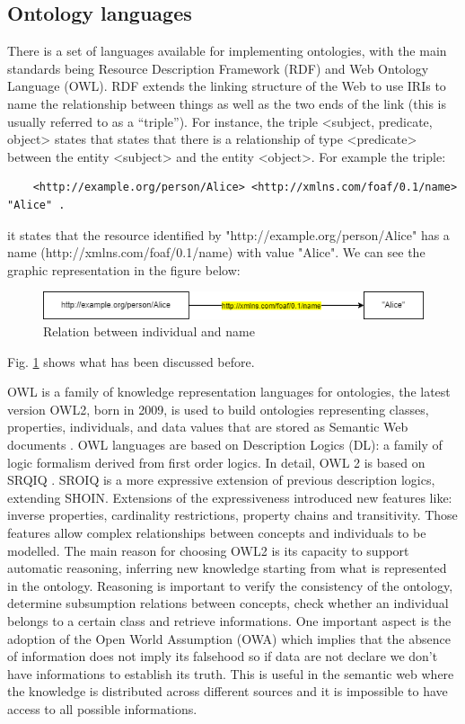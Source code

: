 \subsection{Ontology languages}
There is a set of languages available for implementing ontologies, with the main standards being Resource Description Framework (RDF) and Web Ontology Language (OWL).
RDF extends the linking structure of the Web to use IRIs to name the relationship between things as well as the two ends of the link (this is usually referred to as a “triple”).
For instance, the triple <subject, predicate, object> states that states that there is a relationship of type <predicate> between the entity <subject> and the entity <object>. For example the triple:
\begin{lstlisting}
    <http://example.org/person/Alice> <http://xmlns.com/foaf/0.1/name> "Alice" .
\end{lstlisting}
it states that the resource identified by "http://example.org/person/Alice" has a name (http://xmlns.com/foaf/0.1/name) with value "Alice".
We can see the graphic representation in the figure below:
\begin{figure}[H]
    \centering
    \includegraphics[width=0.9\linewidth]{Figures/fig_85.png}
    \caption{Relation between individual and name}
    \label{fig:alice}
\end{figure}
Fig. \ref{fig:alice} shows what has been discussed before.

OWL is a family of knowledge representation languages for ontologies, the latest version OWL2, born in 2009, is used to build ontologies representing classes, properties, individuals, and data values that are stored as Semantic Web documents \cite{owl2}. OWL languages are based on Description Logics (DL): a family of logic formalism derived from first order logics. In detail, OWL 2 is based on SRQIQ \cite{sroiq}. SROIQ is a more expressive extension of previous description logics, extending SHOIN. Extensions of the expressiveness introduced new features like: inverse properties, cardinality restrictions, property chains and transitivity. Those features allow complex relationships between concepts and individuals to be modelled.
The main reason for choosing OWL2 is its capacity to support automatic reasoning, inferring new knowledge starting from what is represented in the ontology. Reasoning is important to verify the consistency of the ontology, determine subsumption relations between concepts, check whether an individual belongs to a certain class and retrieve informations. One important aspect is the adoption of the Open World Assumption (OWA) which implies that the absence of information does not imply its falsehood so if data are not declare we don't have informations to establish its truth. This is useful in the semantic web where the knowledge is distributed across different sources and it is impossible to have access to all possible informations.


